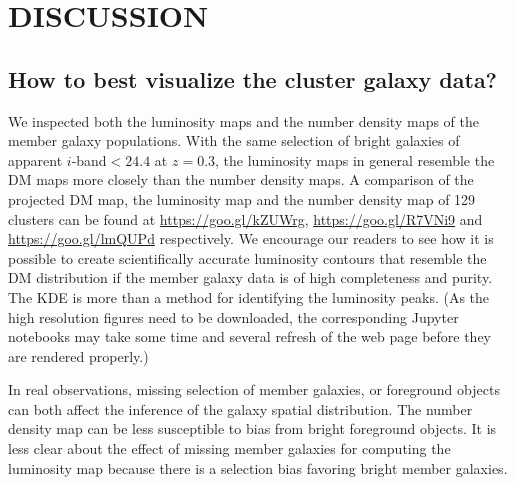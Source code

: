 % 
 
 
 
\section{DISCUSSION}\label{sec:discussion}

\subsection{How to best visualize the cluster galaxy data?}
We inspected both the luminosity maps and the
number density maps of the member galaxy populations.
With the same selection of bright galaxies of apparent $i$-band$ < 24.4$ at
$z=0.3$, the luminosity maps in general resemble the DM maps more closely than 
the number density maps.
A comparison of the projected 
DM map, the luminosity map and the number density map of 129 clusters 
can be found at \href{https://goo.gl/kZUWrg}{https://goo.gl/kZUWrg}, 
\href{https://goo.gl/R7VNi9}{https://goo.gl/R7VNi9} and
\href{https://goo.gl/lmQUPd}{https://goo.gl/lmQUPd} respectively. 
We encourage our readers to see how it is possible
to create scientifically accurate luminosity contours that resemble 
the DM distribution if the member galaxy
data is of high completeness and purity. The KDE is more than a method for
identifying the luminosity peaks.
(As the high resolution figures need to be downloaded, the 
corresponding Jupyter notebooks may take some time and several refresh of the
web page before they are rendered properly.)

In real observations, missing selection of member galaxies, or 
foreground objects can both affect the inference of the galaxy spatial 
distribution. The number density map can be less susceptible to bias from bright 
foreground objects. It is less clear about the effect of missing member galaxies 
for computing the luminosity map because there is a selection bias favoring 
bright member galaxies.

